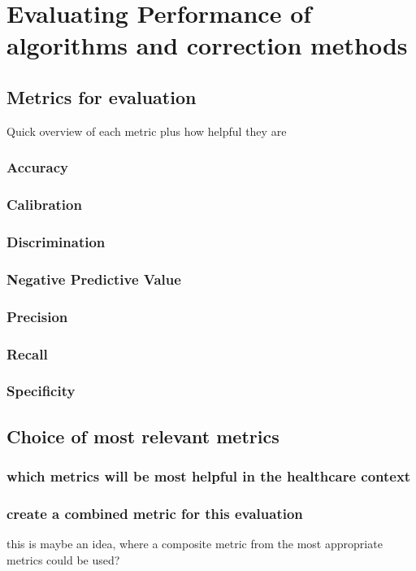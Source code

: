 \section{Evaluating Performance of algorithms and correction methods}

\subsection{Metrics for evaluation}
Quick overview of each metric plus how helpful they are 
\subsubsection{Accuracy}
\subsubsection{Calibration}
\subsubsection{Discrimination}
\subsubsection{Negative Predictive Value}
\subsubsection{Precision}
\subsubsection{Recall}
\subsubsection{Specificity}

\subsection{Choice of most relevant metrics}
\subsubsection{which metrics will be most helpful in the healthcare context}
\subsubsection{create a combined metric for this evaluation}
this is maybe an idea, where a composite metric from the most appropriate metrics could be used?

